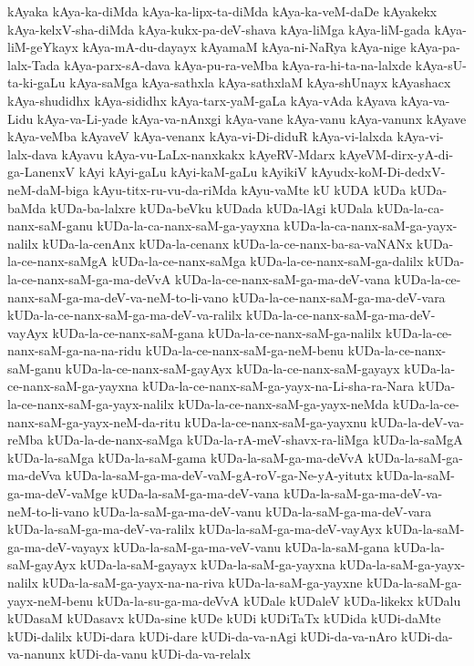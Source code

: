 {kAyaka
kAya-ka-diMda
kAya-ka-lipx-ta-diMda
kAya-ka-veM-daDe
kAyakekx
kAya-kelxV-sha-diMda
kAya-kukx-pa-deV-shava
kAya-liMga
kAya-liM-gada
kAya-liM-geYkayx
kAya-mA-du-dayayx
kAyamaM
kAya-ni-NaRya
kAya-nige
kAya-pa-lalx-Tada
kAya-parx-sA-dava
kAya-pu-ra-veMba
kAya-ra-hi-ta-na-lalxde
kAya-sU-ta-ki-gaLu
kAya-saMga
kAya-sathxla
kAya-sathxlaM
kAya-shUnayx
kAyashacx
kAya-shudidhx
kAya-sididhx
kAya-tarx-yaM-gaLa
kAya-vAda
kAyava
kAya-va-Lidu
kAya-va-Li-yade
kAya-va-nAnxgi
kAya-vane
kAya-vanu
kAya-vanunx
kAyave
kAya-veMba
kAyaveV
kAya-venanx
kAya-vi-Di-diduR
kAya-vi-lalxda
kAya-vi-lalx-dava
kAyavu
kAya-vu-LaLx-nanxkakx
kAyeRV-Mdarx
kAyeVM-dirx-yA-di-ga-LanenxV
kAyi
kAyi-gaLu
kAyi-kaM-gaLu
kAyikiV
kAyudx-koM-Di-dedxV-neM-daM-biga
kAyu-titx-ru-vu-da-riMda
kAyu-vaMte
kU
kUDA
kUDa
kUDa-baMda
kUDa-ba-lalxre
kUDa-beVku
kUDada
kUDa-lAgi
kUDala
kUDa-la-ca-nanx-saM-ganu
kUDa-la-ca-nanx-saM-ga-yayxna
kUDa-la-ca-nanx-saM-ga-yayx-nalilx
kUDa-la-cenAnx
kUDa-la-cenanx
kUDa-la-ce-nanx-ba-sa-vaNANx
kUDa-la-ce-nanx-saMgA
kUDa-la-ce-nanx-saMga
kUDa-la-ce-nanx-saM-ga-dalilx
kUDa-la-ce-nanx-saM-ga-ma-deVvA
kUDa-la-ce-nanx-saM-ga-ma-deV-vana
kUDa-la-ce-nanx-saM-ga-ma-deV-va-neM-to-li-vano
kUDa-la-ce-nanx-saM-ga-ma-deV-vara
kUDa-la-ce-nanx-saM-ga-ma-deV-va-ralilx
kUDa-la-ce-nanx-saM-ga-ma-deV-vayAyx
kUDa-la-ce-nanx-saM-gana
kUDa-la-ce-nanx-saM-ga-nalilx
kUDa-la-ce-nanx-saM-ga-na-na-ridu
kUDa-la-ce-nanx-saM-ga-neM-benu
kUDa-la-ce-nanx-saM-ganu
kUDa-la-ce-nanx-saM-gayAyx
kUDa-la-ce-nanx-saM-gayayx
kUDa-la-ce-nanx-saM-ga-yayxna
kUDa-la-ce-nanx-saM-ga-yayx-na-Li-sha-ra-Nara
kUDa-la-ce-nanx-saM-ga-yayx-nalilx
kUDa-la-ce-nanx-saM-ga-yayx-neMda
kUDa-la-ce-nanx-saM-ga-yayx-neM-da-ritu
kUDa-la-ce-nanx-saM-ga-yayxnu
kUDa-la-deV-va-reMba
kUDa-la-de-nanx-saMga
kUDa-la-rA-meV-shavx-ra-liMga
kUDa-la-saMgA
kUDa-la-saMga
kUDa-la-saM-gama
kUDa-la-saM-ga-ma-deVvA
kUDa-la-saM-ga-ma-deVva
kUDa-la-saM-ga-ma-deV-vaM-gA-roV-ga-Ne-yA-yitutx
kUDa-la-saM-ga-ma-deV-vaMge
kUDa-la-saM-ga-ma-deV-vana
kUDa-la-saM-ga-ma-deV-va-neM-to-li-vano
kUDa-la-saM-ga-ma-deV-vanu
kUDa-la-saM-ga-ma-deV-vara
kUDa-la-saM-ga-ma-deV-va-ralilx
kUDa-la-saM-ga-ma-deV-vayAyx
kUDa-la-saM-ga-ma-deV-vayayx
kUDa-la-saM-ga-ma-veV-vanu
kUDa-la-saM-gana
kUDa-la-saM-gayAyx
kUDa-la-saM-gayayx
kUDa-la-saM-ga-yayxna
kUDa-la-saM-ga-yayx-nalilx
kUDa-la-saM-ga-yayx-na-na-riva
kUDa-la-saM-ga-yayxne
kUDa-la-saM-ga-yayx-neM-benu
kUDa-la-su-ga-ma-deVvA
kUDale
kUDaleV
kUDa-likekx
kUDalu
kUDasaM
kUDasavx
kUDa-sine
kUDe
kUDi
kUDiTaTx
kUDida
kUDi-daMte
kUDi-dalilx
kUDi-dara
kUDi-dare
kUDi-da-va-nAgi
kUDi-da-va-nAro
kUDi-da-va-nanunx
kUDi-da-vanu
kUDi-da-va-relalx
}

